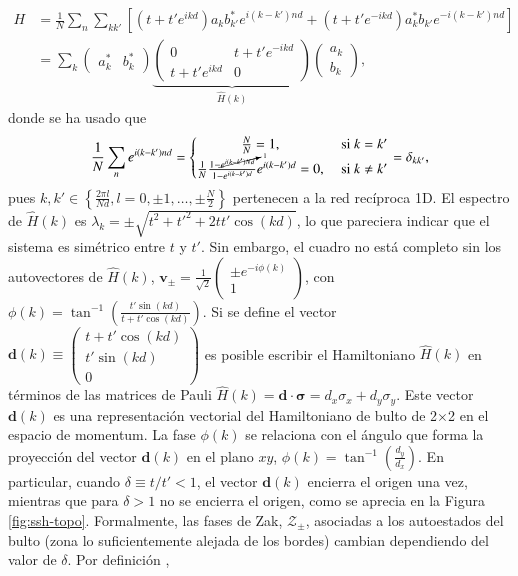 \begin{align*}
	H &= \frac{1}{N}\sum_n \sum_{k k'} \left[\left(t + t' e^{ikd}\right) a_k b_{k'}^* e^{i(k-k')nd}  + \left(t  + t' e^{-ikd}\right) a_k^* b_{k'} e^{-i(k-k')nd} \right]
	\\
	&=  \sum_k 
	\begin{pmatrix}
		a_k^* & b_k^*		
	\end{pmatrix}
	\underbrace{
	\begin{pmatrix}
		0 & t+ t'e^{-ikd}
		\\
		t+ t'e^{ikd} & 0
	\end{pmatrix}}_{\hat{H}(k)}
	\begin{pmatrix}
		a_k
		\\
		b_k		
	\end{pmatrix},
\end{align*}
donde se ha usado que $$\frac{1}{N}\sum_n e^{i(k-k')nd} = \left\{\begin{matrix} \frac{N}{N}=1, &\text{ si } k = k'
\\ \frac{1}{N}\frac{1-\cancelto{1}{e^{i(k-k')Nd}}}{1-e^{i(k-k')d}}e^{i(k-k')d}=0, &\text{ si } k\neq k'
\end{matrix}\right. =\delta_{kk'},$$ pues $k, k' \in  \left\{\frac{2\pi l}{Nd}, l=0,\pm 1, \dots , \pm \frac{N}{2}\right\}$ pertenecen a la red recíproca 1D. El espectro de $\hat{H}(k)$ es $\lambda_k = \pm\sqrt{t^2+t'^2+2tt'\cos(kd)}$, lo que pareciera indicar que el sistema es simétrico entre $t$ y $t'$. Sin embargo, el cuadro no está completo sin los autovectores de $\hat{H}(k)$, $\textbf{v}_\pm =\frac{1}{\sqrt{2}} \begin{pmatrix} \pm e^{-i\phi(k)} \\  1 \end{pmatrix}$, con $\phi(k)=\tan^{-1}\left(\frac{t'\sin(kd)}{t+t'\cos(kd)}\right)$. Si se define el vector $\textbf{d}(k) \equiv \begin{pmatrix}t+t'\cos(kd) \\ t'\sin(kd) \\ 0 \end{pmatrix}$ es posible escribir el Hamiltoniano $\hat{H}(k)$ en términos de las matrices de Pauli $\hat{H}(k) = \textbf{d} \cdot \bm{\sigma} = d_x\sigma_x + d_y\sigma_y$. Este vector $\textbf{d}(k)$ es una representación vectorial del Hamiltoniano de bulto de 2$\times$2 en el espacio de momentum. La fase $\phi(k)$ se relaciona con el ángulo que forma la proyección del vector $\textbf{d}(k)$ en el plano $xy$,  $\phi(k)=\tan^{-1}\left( \frac{d_y}{d_x} \right)$. En particular, cuando $\delta \equiv t/t' < 1$, el vector $\textbf{d}(k)$ encierra el origen una vez, mientras que para $\delta > 1$ no se encierra el origen, como se aprecia en la Figura \ref{fig:ssh-topo}. Formalmente, las fases de Zak, $\mathcal{Z}_\pm$, asociadas a los autoestados del bulto (zona lo suficientemente alejada de los bordes) cambian dependiendo del valor de $\delta$. Por definición \citep{zak_berry}, \begin{align*}

\end{align*}
